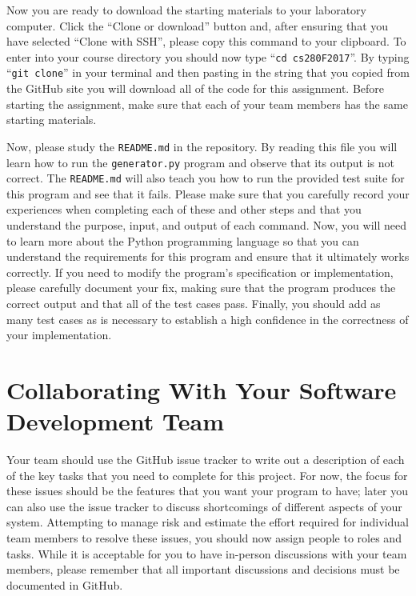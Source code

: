 \documentclass[11pt]{article}
\newcommand{\mainprogram}{\lstinline{generator.py}}
\newcommand{\reflection}{\lstinline{README.md}}
\newcommand{\command}[1]{``\lstinline{#1}''}
\begin{document}
Now you are ready to download the starting materials to your laboratory computer. Click the ``Clone or download'' button
and, after ensuring that you have selected ``Clone with SSH'', please copy this command to your clipboard. To enter into
your course directory you should now type \command{cd cs280F2017}. By typing \command{git clone} in your terminal and
then pasting in the string that you copied from the GitHub site you will download all of the code for this assignment.
Before starting the assignment, make sure that each of your team members has the same starting materials.

Now, please study the \reflection{} in the repository. By reading this file you will learn how to run the \mainprogram{}
program and observe that its output is not correct. The \reflection{} will also teach you how to run the provided test
suite for this program and see that it fails. Please make sure that you carefully record your experiences when
completing each of these and other steps and that you understand the purpose, input, and output of each command. Now,
you will need to learn more about the Python programming language so that you can understand the requirements for this
program and ensure that it ultimately works correctly. If you need to modify the program's specification or
implementation, please carefully document your fix, making sure that the program produces the correct output and that
all of the test cases pass. Finally, you should add as many test cases as is necessary to establish a high confidence in
the correctness of your implementation.

\section*{Collaborating With Your Software Development Team}

Your team should use the GitHub issue tracker to write out a description of each of the key tasks that you need to
complete for this project. For now, the focus for these issues should be the features that you want your program to
have; later you can also use the issue tracker to discuss shortcomings of different aspects of your system. Attempting
to manage risk and estimate the effort required for individual team members to resolve these issues, you should now
assign people to roles and tasks. While it is acceptable for you to have in-person discussions with your team members,
please remember that all important discussions and decisions must be documented in GitHub.
\end{document}
